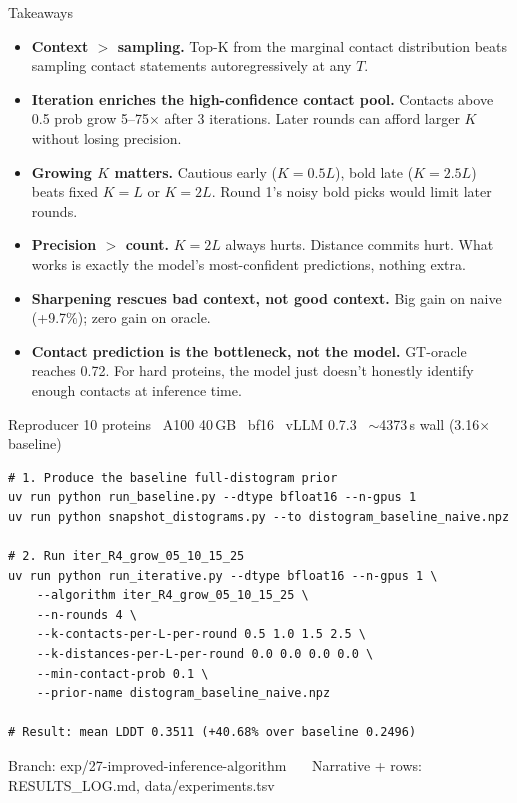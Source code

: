 \documentclass[aspectratio=169,11pt]{beamer}
\begin{document}
\begin{frame}{Takeaways}
  \small
  \begin{itemize}
    \setlength\itemsep{0.25em}
    \item[\color{navy}\textbullet] \textbf{Context $>$ sampling.}
      Top-K from the marginal contact distribution beats sampling contact
      statements autoregressively at any $T$.
    \item[\color{navy}\textbullet] \textbf{Iteration enriches the high-confidence
      contact pool.} Contacts above 0.5 prob grow 5--75$\times$ after 3
      iterations. Later rounds can afford larger $K$ without losing precision.
    \item[\color{navy}\textbullet] \textbf{Growing $K$ matters.}
      Cautious early ($K=0.5L$), bold late ($K=2.5L$) beats fixed $K=L$ or
      $K=2L$. Round 1's noisy bold picks would limit later rounds.
    \item[\color{navy}\textbullet] \textbf{Precision $>$ count.}
      $K=2L$ always hurts. Distance commits hurt. What works is exactly the
      model's most-confident predictions, nothing extra.
    \item[\color{navy}\textbullet] \textbf{Sharpening rescues bad context, not
      good context.} Big gain on naive (+9.7\%); zero gain on oracle.
    \item[\color{navy}\textbullet] \textbf{Contact prediction is the
      bottleneck, not the model.} GT-oracle reaches 0.72. For hard proteins,
      the model just doesn't honestly identify enough contacts at inference time.
  \end{itemize}
\end{frame}

\begin{frame}[fragile]{Reproducer}
  {\footnotesize 10 proteins \textperiodcentered\ A100 40\,GB \textperiodcentered\ bf16
    \textperiodcentered\ vLLM 0.7.3 \textperiodcentered\
    $\sim$4373\,s wall (3.16$\times$ baseline)}\\[0.3em]
  \begin{lstlisting}[style=code,basicstyle=\ttfamily\footnotesize\color{navy}]
# 1. Produce the baseline full-distogram prior
uv run python run_baseline.py --dtype bfloat16 --n-gpus 1
uv run python snapshot_distograms.py --to distogram_baseline_naive.npz

# 2. Run iter_R4_grow_05_10_15_25
uv run python run_iterative.py --dtype bfloat16 --n-gpus 1 \
    --algorithm iter_R4_grow_05_10_15_25 \
    --n-rounds 4 \
    --k-contacts-per-L-per-round 0.5 1.0 1.5 2.5 \
    --k-distances-per-L-per-round 0.0 0.0 0.0 0.0 \
    --min-contact-prob 0.1 \
    --prior-name distogram_baseline_naive.npz

# Result: mean LDDT 0.3511 (+40.68% over baseline 0.2496)
  \end{lstlisting}
  \vspace{0.2em}
  {\scriptsize\color{grey}\ttfamily Branch: exp/27-improved-inference-algorithm \
    \textperiodcentered\ \ Narrative + rows: RESULTS\_LOG.md, data/experiments.tsv}
\end{frame}
\end{document}
